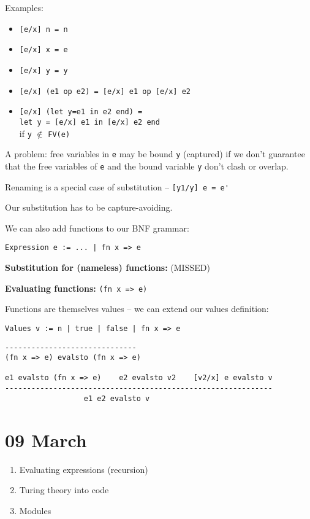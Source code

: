 \documentclass[11pt]{article}
\begin{document}
Examples:
\begin{itemize}
    \item \verb~[e/x] n = n~
    \item \verb~[e/x] x = e~
    \item \verb~[e/x] y = y~
    \item \verb~[e/x] (e1 op e2) = [e/x] e1 op [e/x] e2~
    \item \verb~[e/x] (let y=e1 in e2 end) =~ \\
        \verb~let y = [e/x] e1 in [e/x] e2 end~ \\
        if \verb~y~ $\notin$ \verb~FV(e)~
\end{itemize}

A problem: free variables in \verb~e~ may be bound \verb~y~ (captured) if we don't guarantee that the free variables of \verb~e~ and the bound variable \verb~y~ don't clash or overlap. 

Renaming is a special case of substitution -- \verb~[y1/y] e = e'~

Our substitution has to be capture-avoiding.

We can also add functions to our BNF grammar:
\begin{verbatim}
Expression e := ... | fn x => e
\end{verbatim}

\textbf{Substitution for (nameless) functions:} (MISSED)

\textbf{Evaluating functions:} \verb~(fn x => e)~

Functions are themselves values -- we can extend our values definition:
\begin{verbatim}
Values v := n | true | false | fn x => e
\end{verbatim}

\begin{verbatim}
------------------------------
(fn x => e) evalsto (fn x => e)

e1 evalsto (fn x => e)    e2 evalsto v2    [v2/x] e evalsto v
-------------------------------------------------------------
                  e1 e2 evalsto v
\end{verbatim}

\section{09 March}
\begin{enumerate}
    \item Evaluating expressions (recursion)
    \item Turing theory into code
    \item Modules
\end{enumerate}
\end{document}
